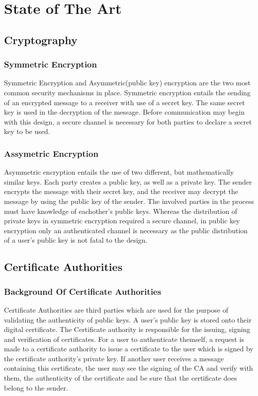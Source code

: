 \chapter{State of The Art}



\section{Cryptography}
\subsection{Symmetric Encryption}
Symmetric Encryption and Asymmetric(public key) encryption are the two most common security mechanisms in place. Symmetric encryption entails the sending of an encrypted message to a receiver with use of a secret key. The same secret key is used in the decryption of the message. Before communication may begin with this design, a secure channel is necessary for both parties to declare a secret key to be used.

\subsection{Assymetric Encryption}
Asymmetric encryption entails the use of two different, but mathematically similar keys. Each party creates a public key, as well as a private key. The sender encrypts the message with their secret key, and the receiver may decrypt the message by using the public key of the sender. The involved parties in the process must have knowledge of eachother’s public keys. Whereas the distribution of private keys in symmetric encryption required a secure channel, in public key encryption only an authenticated channel is necessary as the public distribution of a user’s public key is not fatal to the design.

\section{Certificate Authorities}

\subsection{Background Of Certificate Authorities}
Certificate Authorities are third parties which are used for the purpose of validating the authenticity of public keys. A user’s public key is stored onto their digital certificate. The Certificate authority is responsible for the issuing, signing and verification of certificates. For a user to authenticate themself, a request is made to a certificate authority to issue a certificate to the user which is signed by the certificate authority’s private key. If another user receives a message containing this certificate, the user may see the signing of the CA and verify with them, the authenticity of the certificate and be sure that the certificate does belong to the sender.

